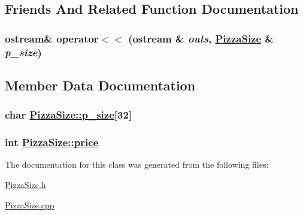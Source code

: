 \subsection{Friends And Related Function Documentation}
\hypertarget{class_pizza_size_aeefabdbf1b3e9ffbc20170fcdee8bec}{
\subsubsection[operator$<$$<$]{\setlength{\rightskip}{0pt plus 5cm}ostream\& operator$<$$<$ (ostream \& {\em outs}, \hyperlink{class_pizza_size}{Pizza\-Size} \& {\em p\_\-size})}}
\label{class_pizza_size_aeefabdbf1b3e9ffbc20170fcdee8bec}




\subsection{Member Data Documentation}
\hypertarget{class_pizza_size_42c17e691e40072f9ef449e812c5ecc3}{
\subsubsection[p\_\-size]{\setlength{\rightskip}{0pt plus 5cm}char \hyperlink{class_pizza_size_42c17e691e40072f9ef449e812c5ecc3}{Pizza\-Size::p\_\-size}\mbox{[}32\mbox{]}}}
\label{class_pizza_size_42c17e691e40072f9ef449e812c5ecc3}


\hypertarget{class_pizza_size_78a5eb43deef9a7b5b9ce157b9d52ac4}{
\subsubsection[price]{\setlength{\rightskip}{0pt plus 5cm}int \hyperlink{class_pizza_size_78a5eb43deef9a7b5b9ce157b9d52ac4}{Pizza\-Size::price}}}
\label{class_pizza_size_78a5eb43deef9a7b5b9ce157b9d52ac4}




The documentation for this class was generated from the following files:\begin{CompactItemize}
\item 
\hyperlink{_pizza_size_8h}{Pizza\-Size.h}\item 
\hyperlink{_pizza_size_8cpp}{Pizza\-Size.cpp}\end{CompactItemize}
